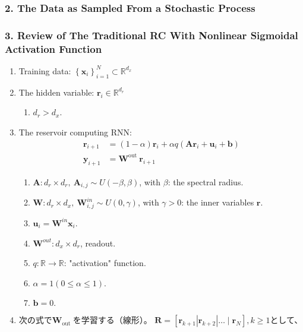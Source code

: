 \subsubsection{2. The Data as Sampled From a Stochastic Process}
\label{Bollt_2}

\subsubsection{3. Review of The Traditional RC With Nonlinear Sigmoidal Activation Function}
\label{Bollt3}

\begin{enumerate}
    \item Training data: $\left\{\mathbf{x}_i\right\}_{i=1}^N \subset \mathbb{R}^{d_x}$
    \item The hidden variable: $\mathbf{r}_i \in \mathbb{R}^{d_r}$\begin{enumerate}
        \item $d_r>d_x$.
    \end{enumerate}
    \item The reservoir computing RNN: 
    $$
    \begin{aligned}
    \mathbf{r}_{i+1} & =(1-\alpha) \mathbf{r}_i+\alpha q\left(\mathbf{A r}_i+\mathbf{u}_i+\mathbf{b}\right) \\
    \mathbf{y}_{i+1} & =\mathbf{W}^{\text {out }} \mathbf{r}_{i+1}
    \end{aligned}
    $$
    \begin{enumerate}
        \item $\mathbf{A}: d_r \times d_r,\ \mathbf{A}_{i, j} \sim U(-\beta, \beta)$, with $\beta$: the spectral radius. 
        \item $\mathbf{W}: d_r \times d_x,\ \mathbf{W}_{i, j}^{i n} \sim U(0, \gamma)$, with $\gamma>0$: the inner variables $\mathbf{r}$.
        \item $\mathbf{u}_i=\mathbf{W}^{i n} \mathbf{x}_i$.
        \item $\mathbf{W}^{out}: d_x \times d_r$, readout.
        \item $q: \mathbb{R} \rightarrow \mathbb{R}$: "activation" function.
        \item $\alpha=1(0\leq\alpha\leq1)$.
        \item $\mathbf{b} = 0.$
    \end{enumerate}
    \item 次の式で$\mathbf{W}_{\text {out }}$を学習する（線形）。
    $\mathbf{R}=\left[\mathbf{r}_{k+1}\left|\mathbf{r}_{k+2}\right| \ldots \mid \mathbf{r}_N\right], k \geq 1$として、

\end{enumerate}
